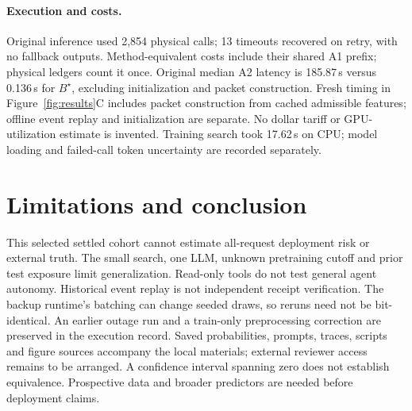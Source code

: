 \documentclass[sigconf,anonymous,review]{acmart}
\begin{document}
\paragraph{Execution and costs.}
Original inference used 2,854 physical calls; 13 timeouts recovered on retry, with no fallback outputs. \ExecutionFinding{} Method-equivalent costs include their shared A1 prefix; physical ledgers count it once. Original median A2 latency is 185.87\,s versus 0.136\,s for $B^\star$, excluding initialization and packet construction. Fresh timing in Figure~\ref{fig:results}C includes packet construction from cached admissible features; offline event replay and initialization are separate. \PreparationFinding{} No dollar tariff or GPU-utilization estimate is invented. Training search took 17.62\,s on CPU; model loading and failed-call token uncertainty are recorded separately.

\section{Limitations and conclusion}
This selected settled cohort cannot estimate all-request deployment risk or external truth. The small search, one LLM, unknown pretraining cutoff and prior test exposure limit generalization. Read-only tools do not test general agent autonomy. Historical event replay is not independent receipt verification. The backup runtime's batching can change seeded draws, so reruns need not be bit-identical. An earlier outage run and a train-only preprocessing correction are preserved in the execution record. Saved probabilities, prompts, traces, scripts and figure sources accompany the local materials; external reviewer access remains to be arranged. \ConclusionAblation{} A confidence interval spanning zero does not establish equivalence. Prospective data and broader predictors are needed before deployment claims.

\balance


\end{document}
